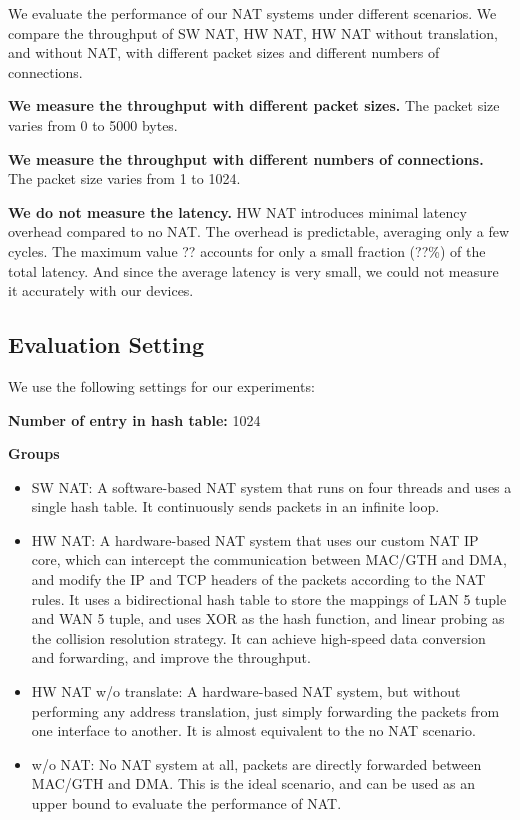 We evaluate the performance of our NAT systems under different scenarios. We compare the throughput of SW NAT, HW NAT, HW NAT without translation, and without NAT, with different packet sizes and different numbers of connections.

\textbf{We measure the throughput with different packet sizes.} The packet size varies from 0 to 5000 bytes.

\textbf{We measure the throughput with different numbers of connections.} The packet size varies from 1 to 1024.

\textbf{We do not measure the latency.} HW NAT introduces minimal latency overhead compared to no NAT. The overhead is predictable, averaging only a few cycles. The maximum value ?? accounts for only a small fraction (??\%) of the total latency. And since the average latency is very small, we could not measure it accurately with our devices.

\subsection{Evaluation Setting}

We use the following settings for our experiments:

\textbf{Number of entry in hash table:} 1024

\textbf{Groups}

\begin{itemize}
    \item {SW NAT}: A software-based NAT system that runs on four threads and uses a single hash table. It continuously sends packets in an infinite loop.
    \item {HW NAT}: A hardware-based NAT system that uses our custom NAT IP core, which can intercept the communication between MAC/GTH and DMA, and modify the IP and TCP headers of the packets according to the NAT rules. It uses a bidirectional hash table to store the mappings of LAN 5 tuple and WAN 5 tuple, and uses XOR as the hash function, and linear probing as the collision resolution strategy. It can achieve high-speed data conversion and forwarding, and improve the throughput.
    \item {HW NAT w/o translate}: A hardware-based NAT system, but without performing any address translation, just simply forwarding the packets from one interface to another. It is almost equivalent to the no NAT scenario.
    \item {w/o NAT}: No NAT system at all, packets are directly forwarded between MAC/GTH and DMA. This is the ideal scenario, and can be used as an upper bound to evaluate the performance of NAT.
\end{itemize}

